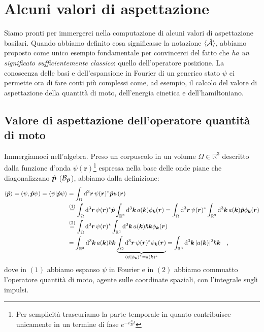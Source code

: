 \section{Alcuni valori di aspettazione}
Siamo pronti per immergerci nella computazione di alcuni valori di aspettazione basilari. Quando abbiamo definito cosa significasse la notazione $ \langle \hat{\mathcal{A}} \rangle $, abbiamo proposto come unico esempio fondamentale per convincerci del fatto che \emph{ha un significato sufficientemente classico}: quello dell'operatore posizione. La conoscenza delle basi e dell'espansione in Fourier di un generico stato $\psi$ ci permette ora di fare conti più complessi come, ad esempio, il calcolo del valore di aspettazione della quantità di moto, dell'energia cinetica e dell'hamiltoniano. 

\subsection{Valore di aspettazione dell'operatore quantità di moto}
Immergiamoci nell'algebra. Preso un corpuscolo in un volume $\Omega \in \mathbb{R}^3$ descritto dalla funzione d'onda $\psi(\bm{r})$\footnote{Per semplicità trascuriamo la parte temporale in quanto contribuisce unicamente in un termine di fase $e^{-i\frac{E}{\hbar}t}$} espressa nella base delle onde piane che diagonalizzano $\hat{\bm{p}}$ ($\mathcal{B}_{\hat{\bm{p}}}$), abbiamo dalla definizione:
\[
    \begin{aligned}
        \left\langle \hat{\bm{p}} \right\rangle = (\psi, \hat{\bm{p}} \psi) = \braket{\psi}{\hat{\bm{p}}\psi} &= \int_\Omega \dd^3{\bm{r}} \, \psi(\bm{r})^*\hat{\bm{p}}\psi(\bm{r}) \\
        &\overset{(1)}{=} \int_\Omega \dd^3{\bm{r}} \, \psi(\bm{r})^* \hat{\bm{p}} \int_{\mathbb{R}^3} \dd^3{\bm{k}} \, a(\bm{k}) \phi_{\bm{k}}(\bm{r}) = \int_\Omega \dd^3{\bm{r}} \, \psi(\bm{r})^* \int_{\mathbb{R}^3} \dd^3{\bm{k}} \, a(\bm{k}) \hat{\bm{p}} \phi_{\bm{k}}(\bm{r}) \\
        &\overset{(2)}{=} \int_\Omega \dd^3{\bm{r}} \, \psi(\bm{r})^* \int_{\mathbb{R}^3} \dd^3{\bm{k}} \, a(\bm{k}) \hbar \bm{k} \phi_{\bm{k}}(\bm{r}) \\
        &= \int_{\mathbb{R}^3} \dd^3{\bm{k}} \, a(\bm{k}) \hbar \bm{k} \underbrace{\int_\Omega \dd^3{\bm{r}} \, \psi(\bm{r})^* \phi_{\bm{k}}(\bm{r})}_{\braket{\psi}{\phi_{\bm{k}}}^* = a(\bm{k})^*} = \int_{\mathbb{R}^3} \dd^3{\bm{k}} \, |a(\bm{k})|^2 \hbar \bm{k} \quad,
    \end{aligned}
\]
dove in $(1)$ abbiamo espanso $\psi$ in Fourier e in $(2)$ abbiamo commuatto l'operatore quantità di moto, agente sulle coordinate spaziali, con l'integrale sugli impulsi. 


